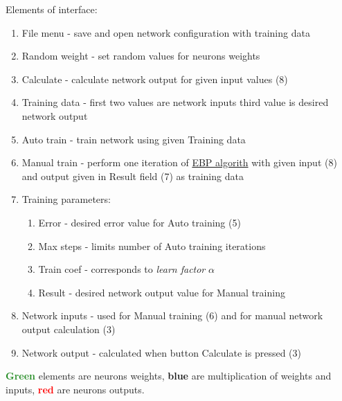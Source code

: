 Elements of interface:
\begin{enumerate}[topsep=8pt,itemsep=-1ex,partopsep=1ex,parsep=1ex]
    \item File menu - save and open network configuration with training data
    \item Random weight - set random values for neurons weights
    \item Calculate - calculate network output for given input values (8)
    \item Training data - first two values are network inputs third value is desired network output
    \item Auto train - train network using given Training data
    \item Manual train - perform one iteration of \hyperref[formula:EBP]{EBP algorith} with given input (8) and output given in Result field (7) as training data
    \item Training parameters:
    \begin{enumerate}[topsep=0pt,itemsep=-1ex,partopsep=1ex,parsep=1ex]
        \item Error - desired error value for Auto training (5)
        \item Max steps - limits number of Auto training iterations
        \item Train coef - corresponds to \textit{learn factor} $\alpha$
        \item Result - desired network output value for Manual training
    \end{enumerate}
    \item Network inputs - used for Manual training (6) and for manual network output calculation (3)
    \item Network output - calculated when button Calculate is pressed (3)
\end{enumerate}
\textcolor{ForestGreen}{\textbf{Green}} elements are neurons weights, \textcolor{Cerulean}{\textbf{blue}} are multiplication of weights and inputs, \textcolor{red}{\textbf{red}} are neurons outputs.